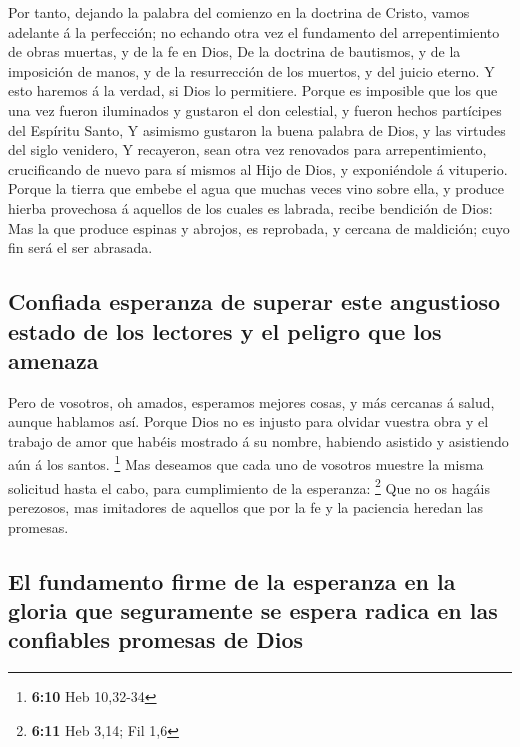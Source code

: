  Por tanto, dejando la palabra del comienzo en la doctrina
de Cristo, vamos adelante á la perfección; no echando otra vez el
fundamento del arrepentimiento de obras muertas, y de la fe en Dios,
 De la doctrina de bautismos, y de la imposición de manos,
y de la resurrección de los muertos, y del juicio eterno. 
Y esto haremos á la verdad, si Dios lo permitiere.  Porque
es imposible que los que una vez fueron iluminados y gustaron el don
celestial, y fueron hechos partícipes del Espíritu Santo, 
Y asimismo gustaron la buena palabra de Dios, y las virtudes del siglo
venidero,  Y recayeron, sean otra vez renovados para
arrepentimiento, crucificando de nuevo para sí mismos al Hijo de Dios, y
exponiéndole á vituperio.  Porque la tierra que embebe el
agua que muchas veces vino sobre ella, y produce hierba provechosa á
aquellos de los cuales es labrada, recibe bendición de Dios:
 Mas la que produce espinas y abrojos, es reprobada, y
cercana de maldición; cuyo fin será el ser abrasada.

\hypertarget{confiada-esperanza-de-superar-este-angustioso-estado-de-los-lectores-y-el-peligro-que-los-amenaza}{%
\subsection{Confiada esperanza de superar este angustioso estado de los
lectores y el peligro que los
amenaza}\label{confiada-esperanza-de-superar-este-angustioso-estado-de-los-lectores-y-el-peligro-que-los-amenaza}}

 Pero de vosotros, oh amados, esperamos mejores cosas, y
más cercanas á salud, aunque hablamos así.  Porque Dios
no es injusto para olvidar vuestra obra y el trabajo de amor que habéis
mostrado á su nombre, habiendo asistido y asistiendo aún á los santos.
\footnote{\textbf{6:10} Heb 10,32-34}  Mas deseamos que
cada uno de vosotros muestre la misma solicitud hasta el cabo, para
cumplimiento de la esperanza: \footnote{\textbf{6:11} Heb 3,14; Fil 1,6}
 Que no os hagáis perezosos, mas imitadores de aquellos
que por la fe y la paciencia heredan las promesas.

\hypertarget{el-fundamento-firme-de-la-esperanza-en-la-gloria-que-seguramente-se-espera-radica-en-las-confiables-promesas-de-dios}{%
\subsection{El fundamento firme de la esperanza en la gloria que
seguramente se espera radica en las confiables promesas de
Dios}\label{el-fundamento-firme-de-la-esperanza-en-la-gloria-que-seguramente-se-espera-radica-en-las-confiables-promesas-de-dios}}

